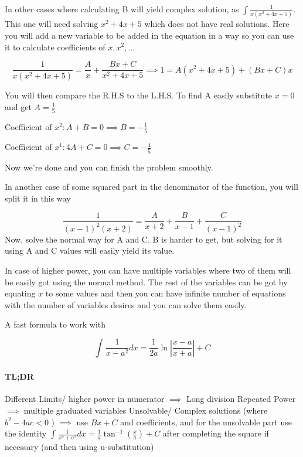 \documentclass{article}
\begin{document}
	In other cases where calculating B will yield complex solution, as $ \int \frac{1}{x(x^2+4x+5)}$.
	This one will need solving $ x^2+4x+5 $ which does not have real solutions. Here you will add a new variable to be added in the equation in a way so you can use it to calculate coefficients of $ x, x^2, ... $

	\[	\frac{1}{x(x^2+4x+5)}= \frac{A}{x} + \frac{ Bx+C }{ x^2+4x+5 }  
	\implies 1 = A(x^2+4x+5) + (Bx+C)x
	\]

	You will then compare the R.H.S to the L.H.S. To find A easily substitute $ x=0 $ and get $ A = \frac{1}{5} $ 

	\begin{center}

		Coefficient of $ x^2: A+B = 0 \implies B = -\frac{1}{5}   $ 

		Coefficient of $ x^1: 4A+C = 0 \implies C = -\frac{4}{5} $ 

	\end{center}


	Now we're done and you can finish the problem smoothly.	



	In another case of some squared part in the denominator of the function, you will split it in this way

	\[
		\frac{1}{(x-1)^2(x+2)}  = \frac{A}{x+2} + \frac{B}{x-1} + \frac{C}{(x-1)^2}
	\]
	Now, solve the normal way for A and C. B is harder to get, but solving for it using A and C values will easily yield its value.

	In case of higher power, you can have multiple variables where two of them will be easily got using the normal method. The rest of the variables can be got by equating $x$ to some values and then you can have infinite number of equations with the number of variables desires and you can solve them easily. \newline

	A fast formula to work with 

	\[
		\int^{}_{} \frac{1}{x-a^2} dx =   \frac{1}{2a} \ln{ | \frac{ x-a }{ x+a }  |  } + C
	\]

	\paragraph{TL;DR}

	Different Limits/ higher power in numerator $ \implies $ Long division \newline 
	Repeated Power $ \implies $ multiple graduated variables\newline
	Unsolvable/ Complex solutions (where $ b^2 -4ac < 0 $ ) $ \implies $ use $ Bx+C $ and coefficients, and for the unsolvable part use the identity $ \int^{}_{} \frac{1}{x^2+a^2} dx = \frac{1}{a} \tan^{-1}(\frac{x}{a})+C  $ after completing the square if necessary (and then using u-substitution)\newline
\end{document}
